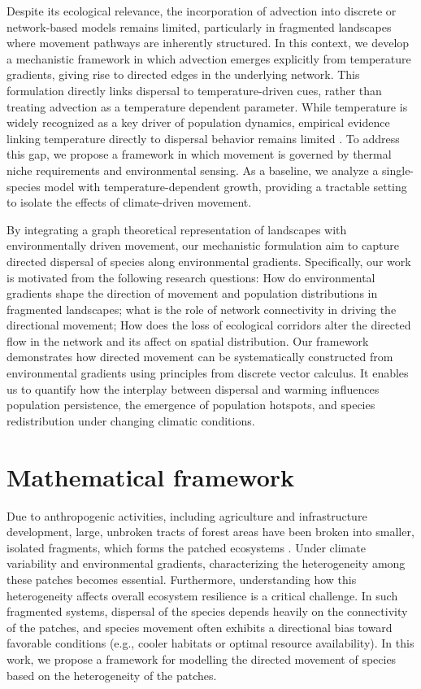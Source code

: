 \documentclass[12pt]{article}
\begin{document}
Despite its ecological relevance, the incorporation of advection into discrete or network-based models remains limited, particularly in fragmented landscapes where movement pathways are inherently structured. In this context, we develop a mechanistic framework in which advection emerges explicitly from temperature gradients, giving rise to directed edges in the underlying network. This formulation directly links dispersal to temperature-driven cues, rather than treating advection as a temperature dependent parameter. While temperature is widely recognized as a key driver of population dynamics, empirical evidence linking temperature directly to dispersal behavior remains limited \cite{amarasekare2024temperature}. To address this gap, we propose a framework in which movement is governed by thermal niche requirements and environmental sensing. As a baseline, we analyze a single-species model with temperature-dependent growth, providing a tractable setting to isolate the effects of climate-driven movement. 

By integrating a graph theoretical representation of landscapes with environmentally driven movement, our mechanistic formulation aim to capture directed dispersal of species along environmental gradients. Specifically, our work is motivated from the following research questions: How do environmental gradients shape the direction of movement and population distributions in fragmented landscapes; what is the role of network connectivity in driving the directional movement; How does the loss of ecological corridors alter the directed flow in the network and its affect on spatial distribution.  Our framework demonstrates how directed movement can be systematically constructed from environmental gradients using principles from discrete vector calculus. It enables us to quantify how the interplay between dispersal and warming influences population persistence, the emergence of population hotspots, and species redistribution under changing climatic conditions. 



\section{Mathematical framework}
Due to anthropogenic activities, including agriculture and infrastructure development, large, unbroken tracts of forest areas have been broken into smaller, isolated fragments, which forms the patched ecosystems \cite{hanski1998metapopulation}. Under climate variability and environmental gradients, characterizing the heterogeneity among these patches becomes essential. Furthermore, understanding how this heterogeneity affects overall ecosystem resilience is a critical challenge. In such fragmented systems, dispersal of the species depends heavily on the connectivity of the patches, and species movement often exhibits a directional bias toward favorable conditions (e.g., cooler habitats or optimal resource availability). In this work, we propose a framework for modelling the directed movement of species based on the heterogeneity of the patches. 
\end{document}
